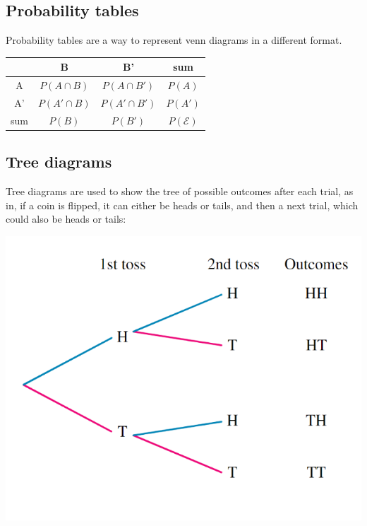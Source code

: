 \documentclass[a4paper,10pt]{report}
\begin{document}
\subsection{Probability tables}
Probability tables are a way to represent venn diagrams in a different format.
\begin{center}
	\begin{tabular}{c|c|c|c}
		    & B              & B'              & sum              \\ \hline
		A   & $P(A \cap B)$  & $P(A \cap B')$  & $P(A)$           \\ \hline
		A'  & $P(A' \cap B)$ & $P(A' \cap B')$ & $P(A')$          \\ \hline
		sum & $P(B)$         & $P(B')$         & $P(\mathcal{E})$
	\end{tabular}
\end{center}

\subsection{Tree diagrams}
Tree diagrams are used to show the tree of possible outcomes after each trial, as in, if a coin is flipped, it can either be heads or tails, and then a next trial, which could also be heads or tails:
\begin{center}
	\includegraphics[scale=0.5]{tree diagrams}
\end{center}
\end{document}
